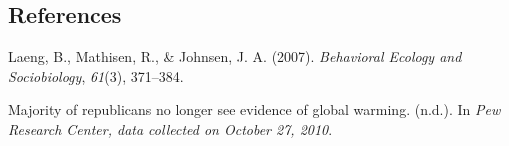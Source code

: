 \documentclass[
]{article}
\newlength{\cslhangindent}
\newlength{\cslentryspacingunit} %
\newenvironment{CSLReferences}[2] %
 {%
  \setlength{\parindent}{0pt}
  \ifodd #1
  \let\oldpar\par
  \def\par{\hangindent=\cslhangindent\oldpar}
  \fi
  \setlength{\parskip}{#2\cslentryspacingunit}
 }%
 {}
\begin{document}
\newpage

\hypertarget{ref}{%
\subsection{References}\label{ref}}

\hypertarget{refs}{}
\begin{CSLReferences}{1}{0}
\leavevmode{}%
Laeng, B., Mathisen, R., \& Johnsen, J. A. (2007). \emph{Behavioral Ecology and Sociobiology}, \emph{61}(3), 371--384.

\leavevmode{}%
Majority of republicans no longer see evidence of global warming. (n.d.). In \emph{Pew Research Center, data collected on October 27, 2010}.

\end{CSLReferences}
\end{document}
